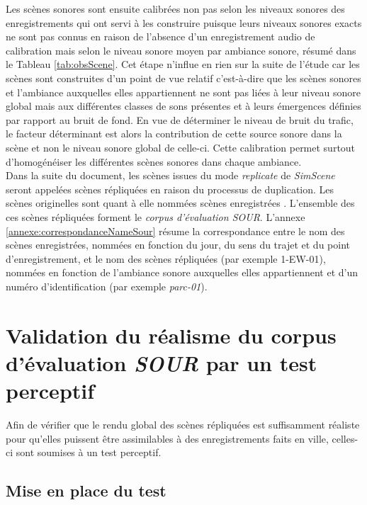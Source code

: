 Les scènes sonores sont ensuite calibrées non pas selon les niveaux sonores des enregistrements qui ont servi à les construire puisque leurs niveaux sonores exacts ne sont pas connus en raison de l'absence d'un enregistrement audio de calibration mais selon le niveau sonore moyen par ambiance sonore, résumé dans le Tableau \ref{tab:obsScene}. 
Cet étape n'influe en rien sur la suite de l'étude car les scènes sont construites d'un point de vue relatif c'est-à-dire que les scènes sonores et l'ambiance auxquelles elles appartiennent ne sont pas liées à leur niveau sonore global mais aux différentes classes de sons présentes et à leurs émergences définies par rapport au bruit de fond. En vue de déterminer le niveau de bruit du trafic, le facteur déterminant est alors la contribution de cette source sonore dans la scène et non le niveau sonore global de celle-ci. Cette calibration permet surtout d'homogénéiser les différentes scènes sonores dans chaque ambiance.\\

Dans la suite du document, les scènes issues du mode \textit{replicate} de \textit{SimScene} seront appelées \og scènes répliquées \fg{} en raison du processus de duplication. Les scènes originelles sont quant à elle nommées \og scènes enregistrées \fg{}. L'ensemble des ces scènes répliquées forment le \textit{corpus d'évaluation SOUR}. L'annexe \ref{annexe:correspondanceNameSour} résume la correspondance entre le nom des scènes enregistrées, nommées en fonction du jour, du sens du trajet et du point d'enregistrement, et le nom des scènes répliquées (par exemple 1-EW-01), nommées en fonction de l'ambiance sonore auxquelles elles appartiennent et d'un numéro d'identification (par exemple \textit{parc-01}). \\


\section{Validation du réalisme du corpus d'évaluation \textit{SOUR} par un test perceptif}\label{sec:test}

Afin de vérifier que le rendu global des scènes répliquées est suffisamment réaliste pour qu'elles puissent être assimilables à des enregistrements faits en ville, celles-ci sont soumises à un test perceptif.

\subsection{Mise en place du test}

